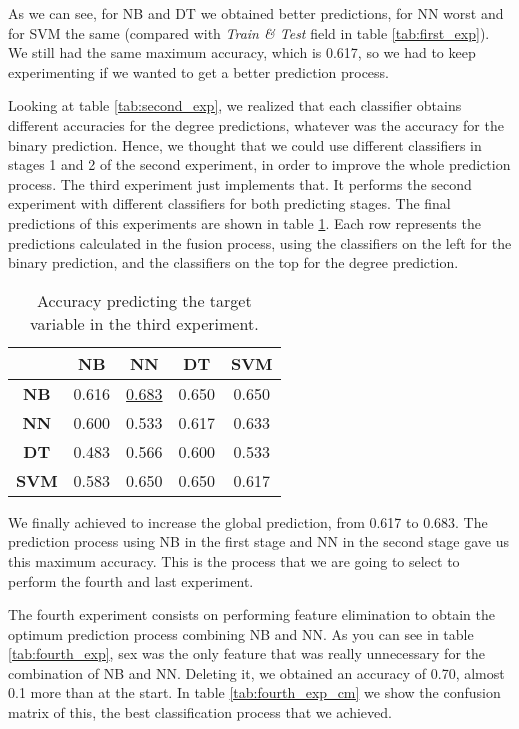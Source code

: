 As we can see, for NB and DT we obtained better predictions, for NN worst and for SVM the same (compared with \textit{Train \& Test} field in table \ref{tab:first_exp}). We still had the same maximum accuracy, which is 0.617, so we had to keep experimenting if we wanted to get a better prediction process.

Looking at table \ref{tab:second_exp}, we realized that each classifier obtains different accuracies for the degree predictions, whatever was the accuracy for the binary prediction. Hence, we thought that we could use different classifiers in stages 1 and 2 of the second experiment, in order to improve the whole prediction process. The third experiment just implements that. It performs the second experiment with different classifiers for both predicting stages. The final predictions of this experiments are shown in table \ref{tab:third_exp}. Each row represents the predictions calculated in the fusion process, using the classifiers on the left for the binary prediction, and the classifiers on the top for the degree prediction.

\begin{table}[hbtp]
    \centering
    \begin{tabular}{c c c c c}
        \toprule
         & \textbf{NB} & \textbf{NN} & \textbf{DT} & \textbf{SVM} \\ \midrule
        \textbf{NB} & 0.616 & \underline{0.683} & 0.650 & 0.650 \\
        \textbf{NN} & 0.600 & 0.533 & 0.617 & 0.633 \\
        \textbf{DT} & 0.483 & 0.566 & 0.600 & 0.533 \\
        \textbf{SVM} & 0.583 & 0.650 & 0.650 & 0.617 \\
        \bottomrule
    \end{tabular}
    \caption{Accuracy predicting the target variable in the third experiment.}
    \label{tab:third_exp}
\end{table}

We finally achieved to increase the global prediction, from 0.617 to 0.683. The prediction process using NB in the first stage and NN in the second stage gave us this maximum accuracy. This is the process that we are going to select to perform the fourth and last experiment.

The fourth experiment consists on performing feature elimination to obtain the optimum prediction process combining NB and NN. As you can see in table \ref{tab:fourth_exp}, sex was the only feature that was really unnecessary for the combination of NB and NN. Deleting it, we obtained an accuracy of 0.70, almost 0.1 more than at the start. In table \ref{tab:fourth_exp_cm} we show the confusion matrix of this, the best classification process that we achieved. 

